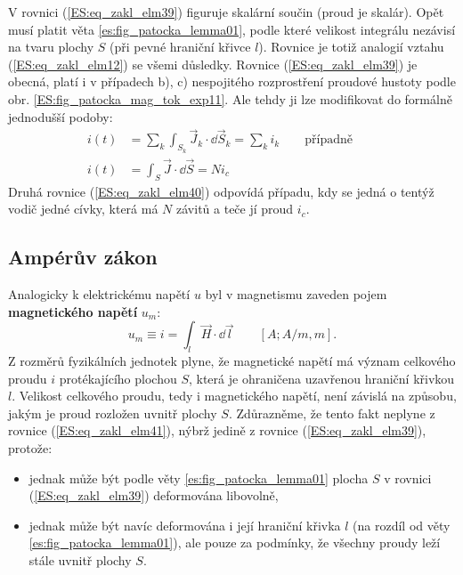         V rovnici (\ref{ES:eq_zakl_elm39}) figuruje skalární součin (proud je skalár). Opět musí 
        platit věta \ref{es:fig_patocka_lemma01}, podle které velikost integrálu nezávisí na tvaru 
        plochy \(S\) (při pevné hraniční křivce \(l\)). Rovnice je totiž analogií vztahu 
        (\ref{ES:eq_zakl_elm12}) se všemi důsledky. Rovnice (\ref{ES:eq_zakl_elm39}) je obecná, 
        platí i v případech b), c) nespojitého rozprostření proudové hustoty podle obr. 
        \ref{ES:fig_patocka_mag_tok_exp11}. Ale tehdy ji lze modifikovat do formálně jednodušší 
        podoby:
        \begin{align}
          i(t) &= \sum_k\int_{S_k}\vec{J}_k\cdot \dd{\vec{S}}_k = \sum_k i_k 
                  \qquad\text{případně}\qquad                         \nonumber \\
          i(t) &= \int_S\vec{J}\cdot \dd{\vec{S}} = Ni_c                  \label{ES:eq_zakl_elm40}
        \end{align} 
        Druhá rovnice (\ref{ES:eq_zakl_elm40}) odpovídá případu, kdy se jedná o tentýž vodič jedné 
        cívky, která má \(N\) závitů a teče jí proud \(i_c\).
      
      \subsection{Ampérův zákon}
        Analogicky k elektrickému napětí \(u\) byl v magnetismu zaveden pojem \textbf{magnetického 
        napětí} \(u_m\):
        \begin{equation}\label{ES:eq_zakl_elm41}
          u_m \equiv i = \int_l \vec{H}\cdot \dd{\vec{l}} \qquad [A; A/m, m].
        \end{equation} 
        Z rozměrů fyzikálních jednotek plyne, že magnetické napětí má význam celkového proudu \(i\) 
        protékajícího plochou \(S\), která je ohraničena uzavřenou hraniční křivkou \(l\). Velikost 
        celkového proudu, tedy i magnetického napětí, není závislá na způsobu, jakým je proud 
        rozložen uvnitř plochy \(S\). Zdůrazněme, že tento fakt neplyne z rovnice 
        (\ref{ES:eq_zakl_elm41}), nýbrž jedině z rovnice (\ref{ES:eq_zakl_elm39}), protože:
        \begin{itemize}         
          \item jednak může být podle věty \ref{es:fig_patocka_lemma01} plocha \(S\) v rovnici 
                (\ref{ES:eq_zakl_elm39}) deformována libovolně,
          \item jednak může být navíc deformována i její hraniční křivka \(l\) (na rozdíl od věty 
                \ref{es:fig_patocka_lemma01}), ale pouze za podmínky, že všechny proudy leží stále 
                uvnitř plochy \(S\).
        \end{itemize}
        

